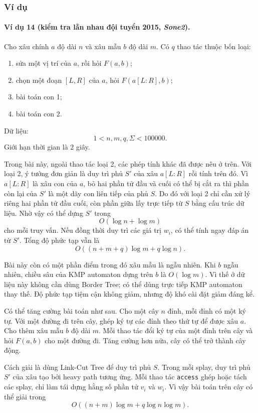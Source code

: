 \documentclass[11pt]{article}
\begin{document}
\subsubsection{Ví dụ}

\paragraph{Ví dụ 14 (kiểm tra lẫn nhau đội tuyển 2015, \emph{Sone2}).}
Cho xâu chính \(a\) độ dài \(n\) và xâu mẫu \(b\) độ dài \(m\). Có \(q\) thao
tác thuộc bốn loại:
\begin{enumerate}
  \item sửa một vị trí của \(a\), rồi hỏi \(F(a,b)\);
  \item chọn một đoạn \([L,R]\) của \(a\), hỏi \(F(a[L:R],b)\);
  \item bài toán con 1;
  \item bài toán con 2.
\end{enumerate}
Dữ liệu:
\[
  1<n,m,q,\Sigma<100000.
\]
Giới hạn thời gian là \(2\) giây.

Trong bài này, ngoài thao tác loại 2, các phép tính khác đã được nêu ở trên. Với
loại 2, ý tưởng đơn giản là duy trì phủ \(S'\) của xâu \(a[L:R]\) rồi tính trên
đó. Vì \(a[L:R]\) là xâu con của \(a\), bỏ hai phần tử đầu và cuối có thể bị cắt
ra thì phần còn lại của \(S'\) là một dãy con liên tiếp của phủ \(S\). Do đó với
loại 2 chỉ cần xử lý riêng hai phần tử đầu cuối, còn phần giữa lấy trực tiếp từ
\(S\) bằng cấu trúc dữ liệu. Nhờ vậy có thể dựng \(S'\) trong
\[
  O(\log n+\log m)
\]
cho mỗi truy vấn. Nếu đồng thời duy trì các giá trị \(w_i\), có thể tính ngay
đáp án từ \(S'\). Tổng độ phức tạp vẫn là
\[
  O((n+m+q)\log m+q\log n).
\]

Bài này còn có một phần điểm trong đó xâu mẫu là ngẫu nhiên. Khi \(b\) ngẫu
nhiên, chiều sâu của KMP automaton dựng trên \(b\) là \(O(\log m)\). Vì thế ở
dữ liệu này không cần dùng Border Tree; có thể dùng trực tiếp KMP automaton thay
thế. Độ phức tạp tiệm cận không giảm, nhưng độ khó cài đặt giảm đáng kể.

Có thể tăng cường bài toán như sau. Cho một cây \(n\) đỉnh, mỗi đỉnh có một ký
tự. Với một đường đi trên cây, ghép ký tự các đỉnh theo thứ tự để được xâu
\(a\). Cho thêm xâu mẫu \(b\) độ dài \(m\). Mỗi thao tác đổi ký tự của một đỉnh
trên cây và hỏi \(F(a,b)\) cho một đường đi. Tăng cường hơn nữa, cây có thể trở
thành cây động.

Cách giải là dùng Link-Cut Tree để duy trì phủ \(S\). Trong mỗi splay, duy trì
phủ \(S'\) của xâu tạo bởi heavy path tương ứng. Mỗi thao tác \texttt{access}
ghép hoặc tách các splay, chỉ làm tái dựng hằng số phần tử \(v_i\) và \(w_i\).
Vì vậy bài toán trên cây có thể giải trong
\[
  O((n+m)\log m+q\log n\log m).
\]
\end{document}
